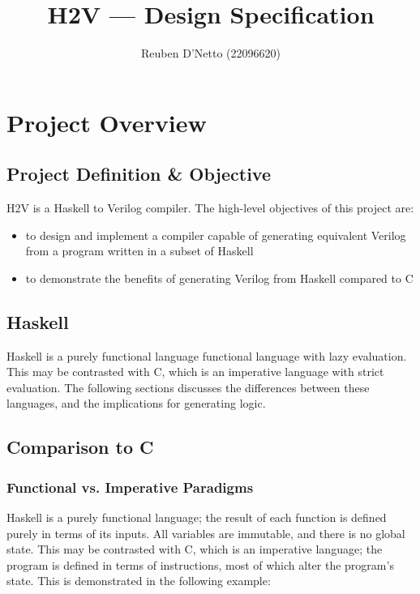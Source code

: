 \documentclass[english,onecolumn]{article}
\begin{document}
\title{H2V --- Design Specification}
\author{Reuben D'Netto (22096620)}

\maketitle
\tableofcontents{}
\pagebreak{}

\section{Project Overview}
\subsection{Project Definition \& Objective}
H2V is a Haskell to Verilog compiler. The high-level objectives of this project are:
\begin{itemize}
\item to design and implement a compiler capable of generating equivalent Verilog from a program written in a subset of Haskell
\item to demonstrate the benefits of generating Verilog from Haskell compared to C
\end{itemize}

\subsection{Haskell}
Haskell is a purely functional language functional language with lazy evaluation.
This may be contrasted with C, which is an imperative language with strict evaluation.
The following sections discusses the differences between these languages, and the implications for generating logic.

\subsection{Comparison to C}
\subsubsection{Functional vs. Imperative Paradigms}
Haskell is a purely functional language; the result of each function is defined purely in terms of its inputs. All variables are immutable, and there is no global state. This may be contrasted with C, which is an imperative language; the program is defined in terms of instructions, most of which alter the program's state. This is demonstrated in the following example:
\end{document}
